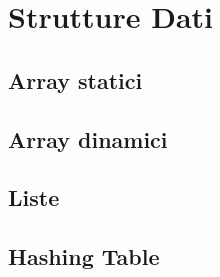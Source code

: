 \chapter{Strutture Dati}

\section{Array statici}

\section{Array dinamici}

\section{Liste}

\section{Hashing Table}